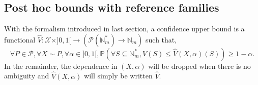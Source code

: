 \documentclass[
  11pt,
  a4paper,
]{article}
\theoremstyle{definition}
\theoremstyle{plain}
\theoremstyle{plain}
\theoremstyle{plain}
\theoremstyle{definition}
\theoremstyle{remark}
\begin{document}
\subsection{Post hoc bounds with reference
families}\label{sec-reference-fam}

With the formalism introduced in last section, a confidence upper bound
is a functional
\(\widehat V:\mathcal X\times ]0,1[\to(\mathcal P(\mathbb{N}_m^*) \to \mathbb{N}_m)\)
such that, \begin{equation}
\forall P\in\mathcal P, \forall X\sim P, \forall \alpha \in ]0,1[, \mathbb{P}\left(\forall S \subseteq \mathbb{N}_m^*, V(S)\leq \widehat V(X,\alpha)(S)\right)\geq 1-\alpha.
\label{eq_confidence_formal}
\end{equation} In the remainder, the dependence in \((X,\alpha)\) will
be dropped when there is no ambiguity and \(\widehat V(X,\alpha)\) will
simply be written \(\widehat V\).
\end{document}
